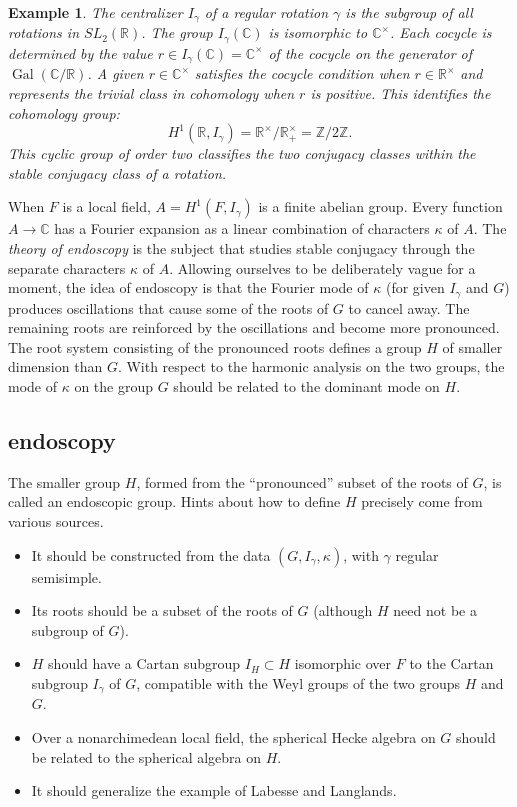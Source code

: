 \documentclass[brochure,english,12pt]{bourbaki}
\theoremstyle{plain}
\newtheorem{example}[equation]{Example}
\def\op#1{{\operatorname{#1}}}
\newcommand{\ring}[1]{\mathbb{#1}}
\begin{document}
\begin{example} The centralizer $I_\gamma$ of a regular rotation
  $\gamma$ is the subgroup of all rotations in $SL_2(\ring{R})$.  The
  group $I_\gamma(\ring{C})$ is isomorphic to $\ring{C}^\times$.  Each
  cocycle is determined by the value $r\in
  I_\gamma(\ring{C})=\ring{C}^\times$ of the cocycle on the generator of
  $\op{Gal}(\ring{C}/\ring{R})$.  A given $r\in\ring{C}^\times$
  satisfies the cocycle condition when $r\in \ring{R}^\times$ and
  represents the trivial class in cohomology when $r$ is positive.
  This identifies the cohomology group:
\[
H^1(\ring{R},I_\gamma) = \ring{R}^\times/\ring{R}^\times_+ = \ring{Z}/2\ring{Z}.
\]
This cyclic group of order two classifies the two conjugacy classes
within the stable conjugacy class of a rotation.
\end{example}

When $F$ is a local field, $A=H^1(F,I_\gamma)$ is a
finite abelian group.  Every function $A\to\ring{C}$  has a
Fourier expansion as a linear combination of characters $\kappa$ of
$A$.  
The {\it theory of endoscopy} is the subject that studies stable
conjugacy through the separate characters $\kappa$ of $A$.  Allowing
ourselves to be deliberately vague for a moment, the idea of endoscopy
is that the Fourier mode of $\kappa$ (for given $I_\gamma$ and $G$)
produces oscillations that cause some of the roots of $G$ to cancel
away.  The remaining roots are reinforced by the oscillations and
become more pronounced.  The root system consisting of the pronounced
roots defines a group $H$ of smaller dimension than $G$.  With respect
to the harmonic analysis on the two groups, the mode of $\kappa$ on
the group $G$ should be related to the dominant mode on $H$.




\subsection{endoscopy}\label{sec:endoscopy}

The smaller group $H$, formed from the ``pronounced'' subset of the
roots of $G$, is called an endoscopic group.  Hints about how to
define $H$ precisely come from various sources.
\begin{itemize}
\item It should be constructed from the data $(G,I_\gamma,\kappa)$, with $\gamma$ regular semisimple.
\item Its roots should be a subset of the roots of $G$ (although $H$ need not
be a subgroup of $G$).
\item $H$ should have a Cartan subgroup $I_H\subset H$ isomorphic over $F$ to the Cartan subgroup
$I_\gamma$ of $G$, compatible with the Weyl groups of the two groups $H$ and $G$.
\item Over a nonarchimedean local field, the spherical Hecke algebra on $G$ should be related to the
spherical algebra on $H$.
\item It should generalize the example of Labesse and Langlands.
\end{itemize}
\end{document}
